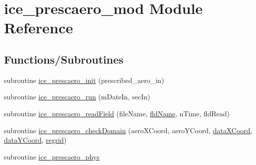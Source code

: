 \hypertarget{namespaceice__prescaero__mod}{
\section{ice\_\-prescaero\_\-mod Module Reference}
\label{namespaceice__prescaero__mod}
}
\subsection*{Functions/Subroutines}
\begin{DoxyCompactItemize}
\item 
subroutine \hyperlink{namespaceice__prescaero__mod_a49687e63d926d56d80c47d29f3348bf3}{ice\_\-prescaero\_\-init} (prescribed\_\-aero\_\-in)
\item 
subroutine \hyperlink{namespaceice__prescaero__mod_a26d851ac89ccf10b178b800a3c9a3c68}{ice\_\-prescaero\_\-run} (mDateIn, secIn)
\item 
subroutine \hyperlink{namespaceice__prescaero__mod_a0abb4e2f6271ccd9b7df6b797d3f6b4e}{ice\_\-prescaero\_\-readField} (fileName, \hyperlink{namespaceice__prescaero__mod_a3ec9a560b31f3c5c6bc587e700ee9570}{fldName}, nTime, fldRead)
\item 
subroutine \hyperlink{namespaceice__prescaero__mod_a047baf1e9b916248581b645f065f84d7}{ice\_\-prescaero\_\-checkDomain} (aeroXCoord, aeroYCoord, \hyperlink{namespaceice__prescaero__mod_aec4bdb0ed27915f50239245791a64619}{dataXCoord}, \hyperlink{namespaceice__prescaero__mod_a7ebbdee8a01449422409a6d584c84806}{dataYCoord}, \hyperlink{namespaceice__prescaero__mod_af47c8a64b468928d1aaad008ef8609d8}{regrid})
\item 
subroutine \hyperlink{namespaceice__prescaero__mod_a255b193e694ed5ffbbad1b5c3935173b}{ice\_\-prescaero\_\-phys}
\end{DoxyCompactItemize}
